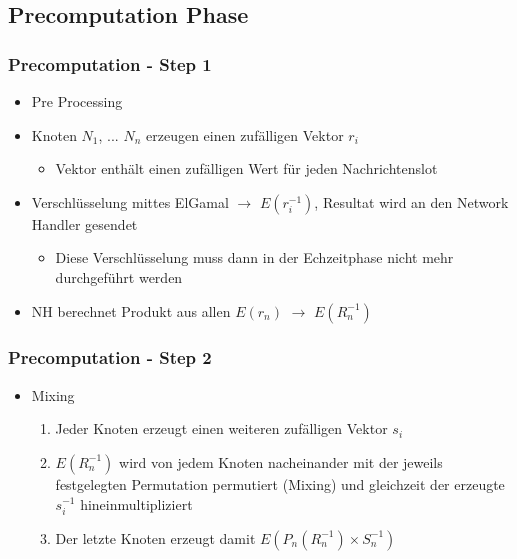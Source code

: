 \documentclass[t, xcolor=dvipsnames]{beamer}
\begin{document}
\subsection{Precomputation Phase} %

\begin{frame}
	\frametitle{Precomputation - Step 1}
	\begin{itemize}
				\item Pre Processing

				\item Knoten $N_1$, ... $N_n$ erzeugen einen zufälligen Vektor $r_i$
				\begin{itemize}
					\item Vektor enthält einen zufälligen Wert für jeden Nachrichtenslot
				\end{itemize}
				\item Verschlüsselung mittes ElGamal $\rightarrow$ $E(r_i^{-1})$, Resultat wird an den Network Handler gesendet
				\begin{itemize}
					\item Diese Verschlüsselung muss dann in der Echzeitphase nicht mehr durchgeführt werden
				\end{itemize}
				\item NH berechnet Produkt aus allen $E(r_n)$ $\rightarrow$ $E(R_n^{-1})$  
		\end{itemize}
	\vspace{\fill}
\end{frame}

\begin{frame}
	\frametitle{Precomputation - Step 2}
	\begin{itemize}
				\item Mixing
				\begin{enumerate}
					\item Jeder Knoten erzeugt einen weiteren zufälligen Vektor $s_i$
					\item $E(R_n^{-1})$ wird von jedem Knoten nacheinander mit der jeweils festgelegten Permutation permutiert (Mixing) und gleichzeit der erzeugte $s_i^{-1}$ hineinmultipliziert
				\item Der letzte Knoten erzeugt damit $E(P_n(R_n^{-1}) \times S_n^{-1})$
				\end{enumerate}

	\end{itemize}
	\vspace{\fill}
\end{frame}
\end{document}
